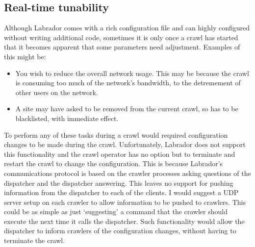 \subsection{Real-time tunability}
Although Labrador comes with a rich configuration file and can highly configured without writing additional code, sometimes it is only once a crawl has started that it becomes apparent that some parameters need adjustment. Examples of this might be:
\begin{itemize}
\item{You wish to reduce the overall network usage. This may be because the crawl is consuming too much of the network's bandwidth, to the detremement of other users on the network.}
\item{A site may have asked to be removed from the current crawl, so has to be blacklisted, with immediate effect.}
\end{itemize}
To perform any of these tasks during a crawl would required configuration changes to be made during the crawl. Unfortunately, Labrador does not support this functionality and the crawl operator has no option but to terminate and restart the crawl to change the configuration. This is because Labrador's communications protocol is based on the crawler processes asking questions of the dispatcher and the dispatcher answering. This leaves no support for pushing information from the dispatcher to each of the clients. I would suggest a UDP server setup on each crawler to allow information to be pushed to crawlers. This could be as simple as just `suggesting' a command that the crawler should execute the next time it calls the dispatcher. Such functionality would allow the dispatcher to inform crawlers of the configuration changes, without having to terminate the crawl.

